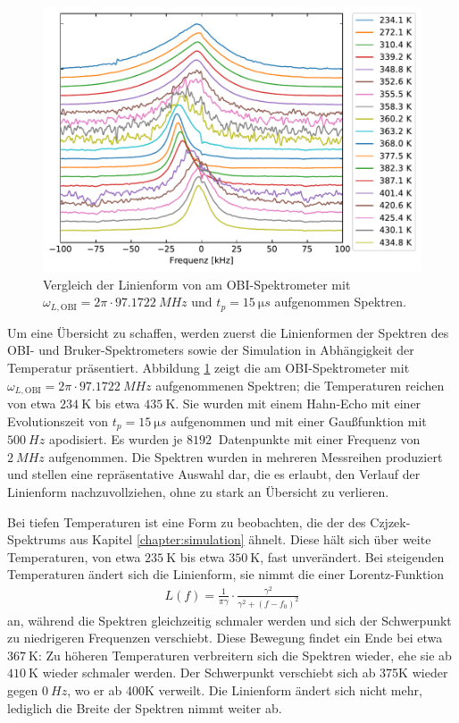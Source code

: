\begin{figure}
	\begin{center}
		\includegraphics[width=\textwidth]{graphics/plot/spek_lineshape.pdf}
	\end{center}
	\caption{Vergleich der Linienform von am OBI-Spektrometer mit $\omega_{L, \text{OBI}} = 2\pi \cdot \SI{97.1722}{MHz}$ und $t_p = \SI{15}{\micro s}$ aufgenommen Spektren.} \label{fig:res:spek_linienform}
\end{figure}
Um eine Übersicht zu schaffen, werden zuerst die Linienformen der Spektren des OBI- und Bruker-Spektrometers sowie der Simulation in Abhängigkeit der Temperatur präsentiert. Abbildung \ref{fig:res:spek_linienform} zeigt die am OBI-Spektrometer mit $\omega_{L, \text{OBI}} = 2\pi \cdot \SI{97.1722}{MHz}$ aufgenommenen Spektren; die Temperaturen reichen von etwa $\SI{234}{\kelvin}$ bis etwa $\SI{435}{\kelvin}$. Sie wurden mit einem Hahn-Echo mit einer Evolutionszeit von $t_p = \SI{15}{\micro s}$ aufgenommen und mit einer Gaußfunktion mit $\SI{500}{Hz}$ apodisiert. Es wurden je $\SI{8192}{}$ Datenpunkte mit einer Frequenz von $\SI{2}{MHz}$ aufgenommen. Die Spektren wurden in mehreren Messreihen produziert und stellen eine repräsentative Auswahl dar, die es erlaubt, den Verlauf der Linienform nachzuvollziehen, ohne zu stark an Übersicht zu verlieren.

Bei tiefen Temperaturen ist eine Form zu beobachten, die der des Czjzek-Spektrums aus Kapitel \ref{chapter:simulation} ähnelt. Diese hält sich über weite Temperaturen, von etwa $\SI{235}{\kelvin}$ bis etwa $\SI{350}{\kelvin}$, fast unverändert. Bei steigenden Temperaturen ändert sich die Linienform, sie nimmt die einer Lorentz-Funktion
\begin{align}
	L(f) = \frac{1}{\pi \gamma} \cdot \frac{\gamma^2}{\gamma^2 + (f - f_0)^2} \label{eqn:res:lorentz}
\end{align}
an, während die Spektren gleichzeitig schmaler werden und sich der Schwerpunkt zu niedrigeren Frequenzen verschiebt. Diese Bewegung findet ein Ende bei etwa $\SI{367}{\kelvin}$: Zu höheren Temperaturen verbreitern sich die Spektren wieder, ehe sie ab $\SI{410}{\kelvin}$ wieder schmaler werden. Der Schwerpunkt verschiebt sich ab 375K wieder gegen $\SI{0}{Hz}$, wo er ab 400K verweilt. Die Linienform ändert sich nicht mehr, lediglich die Breite der Spektren nimmt weiter ab.

